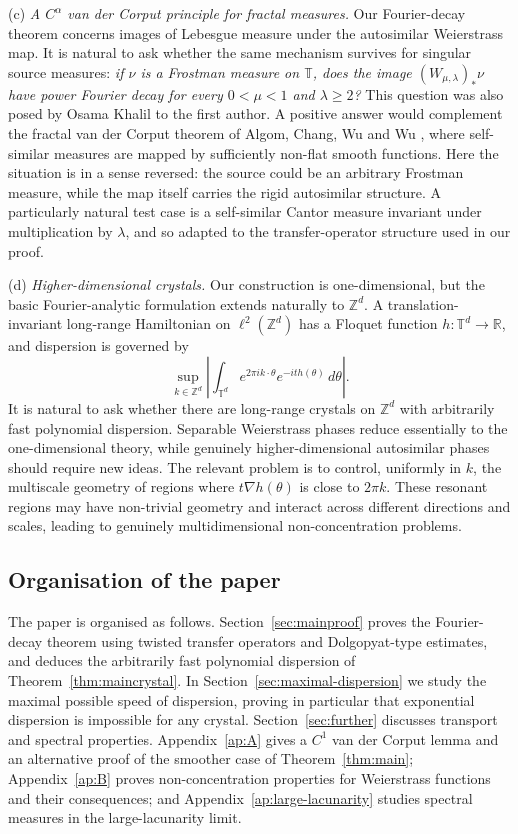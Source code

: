 \documentclass[11pt]{amsart}
\theoremstyle{plain}
\theoremstyle{definition}
\numberwithin{equation}{section}
\begin{document}
(c) \emph{A $C^\alpha$ van der Corput principle for fractal measures.}
Our Fourier-decay theorem concerns images of Lebesgue measure under the autosimilar Weierstrass map. It is natural to ask whether the same mechanism survives for singular source measures: \textit{if $\nu$ is a Frostman measure on $\mathbb T$, does the image $(W_{\mu,\lambda})_*\nu$ have power Fourier decay for every $0<\mu<1$ and $\lambda\geq2$?} This question was also posed by Osama Khalil to the first author. A positive answer would complement the fractal van der Corput theorem of Algom, Chang, Wu and Wu \cite{ACWW}, where self-similar measures are mapped by sufficiently non-flat smooth functions. Here the situation is in a sense reversed: the source could be an arbitrary Frostman measure, while the map itself carries the rigid autosimilar structure. A particularly natural test case is a self-similar Cantor measure invariant under multiplication by $\lambda$, and so adapted to the transfer-operator structure used in our proof.

(d) \emph{Higher-dimensional crystals.}
Our construction is one-dimensional, but the basic Fourier-analytic formulation extends naturally to $\mathbb Z^d$. A translation-invariant long-range Hamiltonian on $\ell^2(\mathbb Z^d)$ has a Floquet function $h:\mathbb T^d\to\mathbb R$, and dispersion is governed by
$$
\sup_{k\in\mathbb Z^d}
\left|
\int_{\mathbb T^d}e^{2\pi i k\cdot\theta}e^{-ith(\theta)}\,d\theta
\right|.
$$
It is natural to ask whether there are long-range crystals on $\mathbb Z^d$ with arbitrarily fast polynomial dispersion. Separable Weierstrass phases reduce essentially to the one-dimensional theory, while genuinely higher-dimensional autosimilar phases should require new ideas. The relevant problem is to control, uniformly in $k$, the multiscale geometry of regions where $t\nabla h(\theta)$ is close to $2\pi k$. These resonant regions may have non-trivial geometry and interact across different directions and scales, leading to genuinely multidimensional non-concentration problems.

\subsection*{Organisation of the paper}

The paper is organised as follows. Section~\ref{sec:mainproof} proves the Fourier-decay theorem using twisted transfer operators and Dolgopyat-type estimates, and deduces the arbitrarily fast polynomial dispersion of Theorem~\ref{thm:maincrystal}. In Section~\ref{sec:maximal-dispersion} we study the maximal possible speed of dispersion, proving in particular that exponential dispersion is impossible for any crystal. Section~\ref{sec:further} discusses transport and spectral properties. Appendix~\ref{ap:A} gives a $C^1$ van der Corput lemma and an alternative proof of the smoother case of Theorem~\ref{thm:main}; Appendix~\ref{ap:B} proves non-concentration properties for Weierstrass functions and their consequences; and Appendix~\ref{ap:large-lacunarity} studies spectral measures in the large-lacunarity limit.
\end{document}
